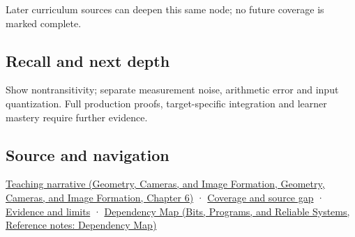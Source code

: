 Later curriculum sources can deepen this same node; no future coverage is marked complete.

\subsection{Recall and next depth}\label{appendix-b5b83329215b-recall-and-next-depth}

Show nontransitivity; separate measurement noise, arithmetic error and input quantization. Full production proofs, target-specific integration and learner mastery require further evidence.

\subsection{Source and navigation}\label{appendix-b5b83329215b-source-and-navigation}

\href{../03-Geometry-Cameras-and-Image-Formation/main.pdf\#nameddest=02-foundations-ii-ch037-reliability-begins-at-the-boundary-of-the-calculation}{Teaching narrative (Geometry, Cameras, and Image Formation, Geometry, Cameras, and Image Formation, Chapter 6)} · \hyperref[appendix-fd090d982a15-phase-6---parts-501-600]{Coverage and source gap} · \hyperref[appendix-a103e7846d21-phase-6---source-analysis-and-verification]{Evidence and limits} · \href{../01-Bits-Programs-and-Reliable-Systems/main.pdf\#nameddest=appendix-4ad47bdd269a}{Dependency Map (Bits, Programs, and Reliable Systems, Reference notes: Dependency Map)}
